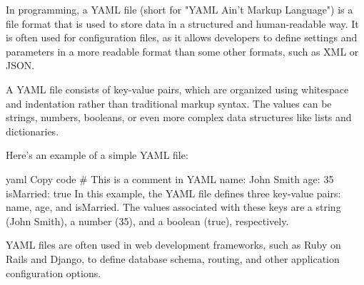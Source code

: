 In programming, a YAML file (short for "YAML Ain't Markup Language") is a file format that is used to store data in a structured and human-readable way. It is often used for configuration files, as it allows developers to define settings and parameters in a more readable format than some other formats, such as XML or JSON.

A YAML file consists of key-value pairs, which are organized using whitespace and indentation rather than traditional markup syntax. The values can be strings, numbers, booleans, or even more complex data structures like lists and dictionaries.

Here's an example of a simple YAML file:

yaml
Copy code
# This is a comment in YAML
name: John Smith
age: 35
isMarried: true
In this example, the YAML file defines three key-value pairs: name, age, and isMarried. The values associated with these keys are a string (John Smith), a number (35), and a boolean (true), respectively.

YAML files are often used in web development frameworks, such as Ruby on Rails and Django, to define database schema, routing, and other application configuration options.
